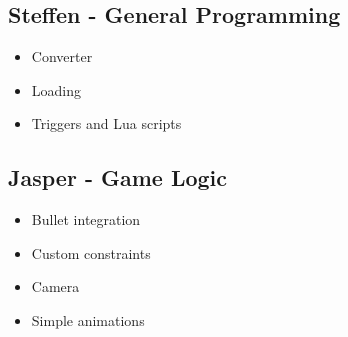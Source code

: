\documentclass{beamer}
\begin{document}
\subsection{Steffen - General Programming}
\begin{frame}
    \begin{itemize}
		\item Converter
		\item Loading
		\item Triggers and Lua scripts
	\end{itemize}
\end{frame}

\subsection{Jasper - Game Logic}
\begin{frame}
    \begin{itemize}
		\item Bullet integration
		\item Custom constraints
		\item Camera
		\item Simple animations
    \end{itemize}
\end{frame}
\end{document}
